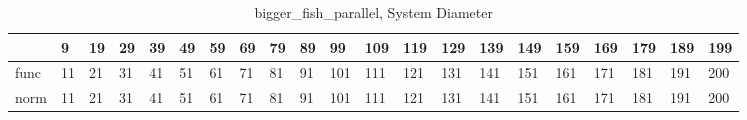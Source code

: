 \begin{table}
\centering
\caption{bigger_fish_parallel, System Diameter}
\label{bigger_fish_parallel_diam}
\begin{tabular}{lllllllllllllllllllll}
\toprule
{} &   9 &  19 &  29 &  39 &  49 &  59 &  69 &  79 &  89 &   99 &  109 &  119 &  129 &  139 &  149 &  159 &  169 &  179 &  189 &  199 \\
\midrule
func &  11 &  21 &  31 &  41 &  51 &  61 &  71 &  81 &  91 &  101 &  111 &  121 &  131 &  141 &  151 &  161 &  171 &  181 &  191 &  200 \\
norm &  11 &  21 &  31 &  41 &  51 &  61 &  71 &  81 &  91 &  101 &  111 &  121 &  131 &  141 &  151 &  161 &  171 &  181 &  191 &  200 \\
\bottomrule
\end{tabular}
\end{table}

